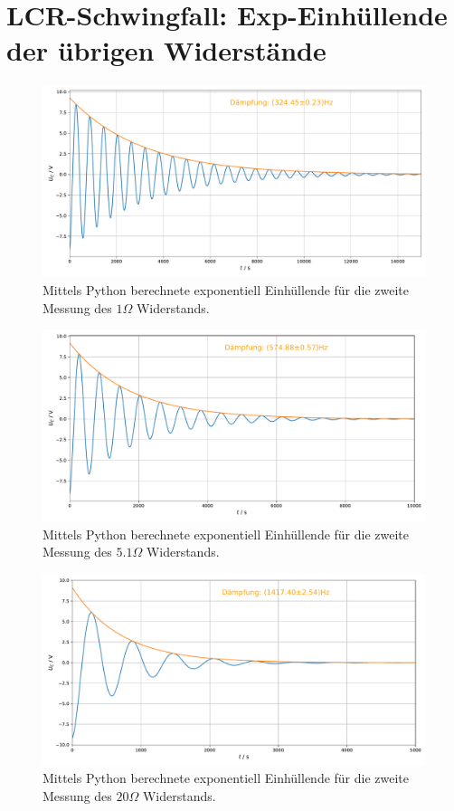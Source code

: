 \documentclass[a4paper, 12pt]{scrartcl}
\begin{document}
\section{LCR-Schwingfall: Exp-Einhüllende der übrigen Widerstände}\label{app:expein}
\begin{figure}[h]
\centering
\includegraphics[width=\textwidth]{plots/einhuellend/exp_einhuellend1_2.pdf}
\caption{Mittels Python berechnete exponentiell Einhüllende für die zweite Messung des $1\Omega$ Widerstands.}
\end{figure}
\begin{figure}[h]
\centering
\includegraphics[width=\textwidth]{plots/einhuellend/exp_einhuellend2_2.pdf}
\caption{Mittels Python berechnete exponentiell Einhüllende für die zweite Messung des $5.1\Omega$ Widerstands.}
\end{figure}
\begin{figure}[h]
\centering
\includegraphics[width=\textwidth]{plots/einhuellend/exp_einhuellend4_2.pdf}
\caption{Mittels Python berechnete exponentiell Einhüllende für die zweite Messung des $20\Omega$ Widerstands.}
\end{figure}
\end{document}

